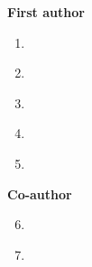 


\begin{cvparagraph}
\textbf{First author}

\begin{enumerate}
\item {}\label{paper:midl}
\item {}\label{paper:diffusion}
\item {}\label{paper:uncertainty}
\item {}\label{paper:hopping}
\item {}\label{paper:inter}
\end{enumerate}

\textbf{Co-author}
\begin{enumerate}
\setcounter{enumi}{5}
\item {}\label{paper:covid}
\item {}\label{paper:nature}
\end{enumerate}
\end{cvparagraph}

